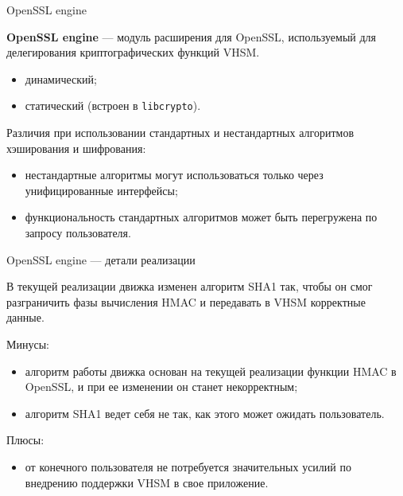 \documentclass[utf8, 11pt]{beamer}
\begin{document}
\begin{frame}{OpenSSL engine}

{\bf OpenSSL engine} --- модуль расширения для OpenSSL, используемый для делегирования криптографических функций VHSM.
\begin{itemize}
\item динамический;
\item статический (встроен в \texttt{libcrypto}).
\end{itemize}

\vspace*{\fill}

Различия при использовании стандартных и нестандартных алгоритмов хэширования и шифрования:
\begin{itemize}
\item нестандартные алгоритмы могут использоваться только через унифицированные интерфейсы;
\item функциональность стандартных алгоритмов может быть перегружена по запросу пользователя.
\end{itemize}

\end{frame}

\begin{frame}{OpenSSL engine --- детали реализации}

В текущей реализации движка изменен алгоритм SHA1 так, чтобы он смог разграничить фазы вычисления HMAC и передавать в VHSM корректные данные.

\vspace*{\fill}

Минусы:
\begin{itemize}
\item алгоритм работы движка основан на текущей реализации функции HMAC в OpenSSL, и при ее изменении он станет некорректным;
\item алгоритм SHA1 ведет себя не так, как этого может ожидать пользователь. 
\end{itemize}

Плюсы:
\begin{itemize}
\item от конечного пользователя не потребуется значительных усилий по внедрению поддержки VHSM в свое приложение.
\end{itemize}

\vspace*{\fill}

\end{frame}
\end{document}
